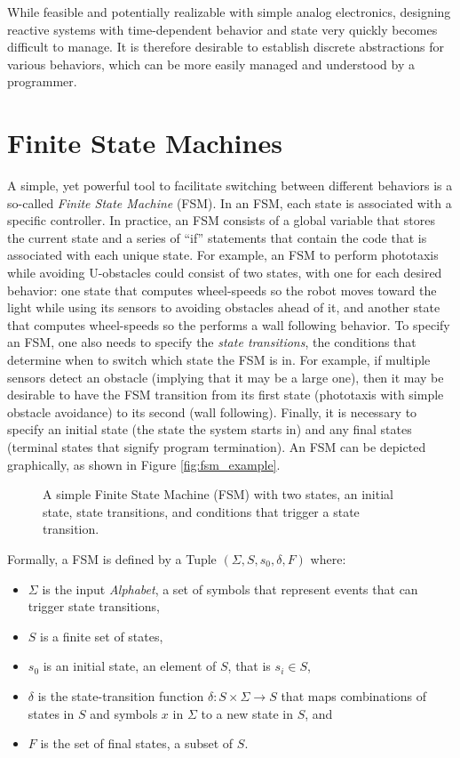 While feasible and potentially realizable with simple analog electronics, designing reactive systems with time-dependent behavior and state very quickly becomes difficult to manage. It is therefore desirable to establish discrete abstractions for various behaviors, which can be more easily managed and understood by a programmer.
%
%
\section{Finite State Machines}\label{sec:fsm}
A simple, yet powerful tool to facilitate switching between different behaviors is a so-called \emph{Finite State Machine} (FSM). In an FSM, each state is associated with a specific controller. In practice, an FSM consists of a global variable that stores the current state and a series of ``if'' statements that contain the code that is associated with each unique state. For example, an FSM to perform phototaxis while avoiding U-obstacles could consist of two states, with one for each desired behavior: one state that computes wheel-speeds so the robot moves toward the light while using its sensors to avoiding obstacles ahead of it, and another state that computes wheel-speeds so the performs a wall following behavior. To specify an FSM, one also needs to specify the \emph{state transitions}, the conditions that determine when to switch which state the FSM is in. For example, if multiple sensors detect an obstacle (implying that it may be a large one), then it may be desirable to have the FSM transition from its first state (phototaxis with simple obstacle avoidance) to its second (wall following). Finally, it is necessary to specify an initial state (the state the system starts in) and any final states (terminal states that signify program termination). An FSM can be depicted graphically, as shown in Figure \ref{fig:fsm_example}.

\begin{figure}
\caption{A simple Finite State Machine (FSM) with two states, an initial state, state transitions, and conditions that trigger a state transition.}
\end{figure}

Formally, a FSM is defined by a Tuple $(\Sigma, S, s_0, \delta, F)$ where:
\begin{itemize}
\item $\Sigma$ is the input \emph{Alphabet}, a set of symbols that represent events that can trigger state transitions,
\item $S$ is a finite set of states,
\item $s_0$ is an initial state, an element of $S$, that is $s_i \in S$,
\item $\delta$ is the state-transition function $\delta: S \times \Sigma \rightarrow S$ that maps combinations of states in $S$ and symbols $x$ in $\Sigma$ to a new state in $S$, and
\item $F$ is the set of final states, a subset of $S$.
\end{itemize}

